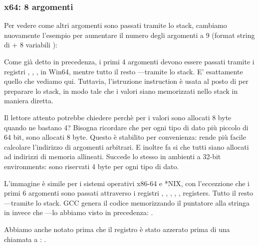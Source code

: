 \subsubsection{x64: 8 argomenti}

\label{example_printf8_x64}
Per vedere come altri argomenti sono passati tramite lo stack, cambiamo nuovamente l'esempio per aumentare il numero degli argomenti a 9 (format string di \printf + 8 variabili \Tint):




Come già detto in precedenza, i primi 4 argomenti devono essere passati tramite i registri \RCX, \RDX, ,  in Win64,
mentre tutto il resto ---tramite lo stack.
E' esattamente quello che vediamo qui.
Tuttavia, l'istruzione \MOV instruction è usata al posto di \PUSH per preparare lo stack, in modo tale che i valori siano memorizzati
nello stack in maniera diretta.



Il lettore attento potrebbe chiedere perchè per i valori \Tint sono allocati 8 byte quando ne bastano 4?
Bisogna ricordare che per ogni tipo di dato più piccolo di 64 bit, sono allocati 8 byte.
Questo è stabilito per convenienza: rende più facile calcolare l'indirizzo di argomenti arbitrari. E inoltre fa si che tutti
siano allocati ad indirizzi di memoria allineati.
Succede lo stesso in ambienti a 32-bit environments: sono riservati 4 byte per ogni tipo di dato.



L'immagine è simile per i sistemi operativi x86-64 e *NIX, con l'eccezzione che i primi 6 argomenti sono passati attraverso
i registri \RDI, \RSI, \RDX, \RCX, ,  registers.
Tutto il resto ---tramite lo stack.
GCC genera il codice memorizzando il puntatore alla stringa in \EDI invece che \RDI{}---lo abbiamo visto in precedenza: 
.

Abbiamo anche notato prima che il registro \EAX è stato azzerato prima di una chiamata a \printf: .



